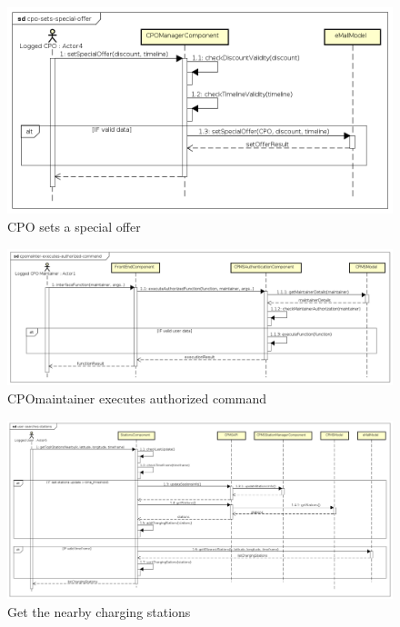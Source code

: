 \begin{figure}[!h]
    \begin{center}
        \includegraphics[keepaspectratio, width=16cm]{Sequence/cpo-sets-special-offer.png}
        \caption{\ac{CPO} sets a special offer}
        \label{fig:cpo-sets-speciale-offer}
    \end{center}
\end{figure}
\begin{figure}[!h]
    \begin{center}
        \includegraphics[keepaspectratio, width=16cm]{Sequence/cpomaintainer-executes-authorized-command.png}
        \caption{\ac{CPO}maintainer executes authorized command}
        \label{fig:cpomaintainer-executes-authorized-command}
    \end{center}
\end{figure}
\begin{figure}[!h]
    \begin{center}
        \includegraphics[keepaspectratio, width=16cm]{Sequence/user-searches-stations.png}
        \caption{Get the nearby charging stations}
        \label{fig:user-searches-stations}
    \end{center}
\end{figure}
